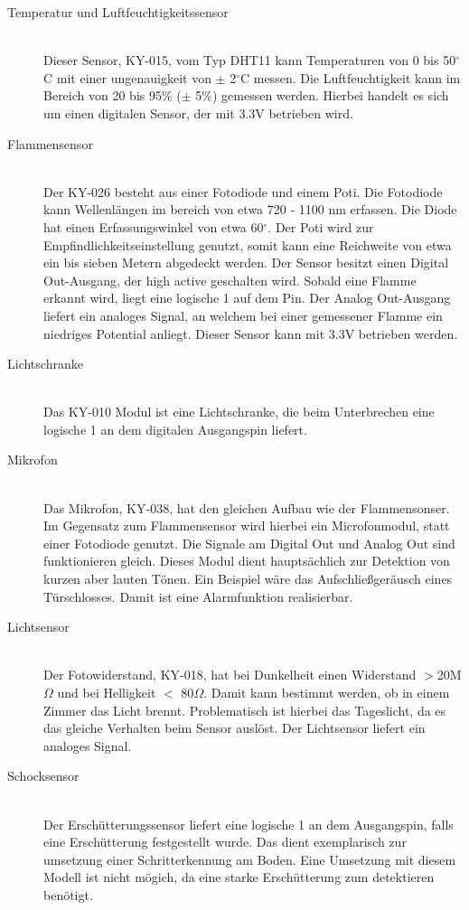 \begin{description}
\item[Temperatur und Luftfeuchtigkeitssensor] \hfill \\
	Dieser Sensor, KY-015, vom Typ DHT11 kann Temperaturen von 0 bis 50$^\circ$C mit einer ungenauigkeit von $\pm$ 2$^\circ$C messen. Die Luftfeuchtigkeit kann im Bereich von 20 bis 95\% ($\pm$ 5\%) gemessen werden. Hierbei handelt es sich um einen digitalen Sensor, der mit 3.3V betrieben wird.  
\item[Flammensensor]\hfill \\
	Der KY-026 besteht aus einer Fotodiode und einem \ac{Poti}. Die Fotodiode kann Wellenlängen im bereich von etwa 720 - 1100 nm erfassen. Die Diode hat einen Erfassungswinkel von etwa 60$^\circ$. Der \ac{Poti} wird zur Empfindlichkeitseinstellung genutzt, somit kann eine Reichweite von etwa  ein bis sieben Metern abgedeckt werden. Der Sensor besitzt einen Digital Out-Ausgang, der high active geschalten wird. Sobald eine Flamme erkannt wird, liegt eine logische 1 auf dem Pin. Der Analog Out-Ausgang liefert ein analoges Signal, an welchem bei einer gemessener Flamme ein niedriges Potential anliegt. Dieser Sensor kann mit 3.3V betrieben werden.
\item[Lichtschranke]\hfill \\
	Das KY-010 Modul ist eine Lichtschranke, die beim Unterbrechen eine logische 1 an dem digitalen Ausgangspin liefert.
\item[Mikrofon]\hfill \\
	Das Mikrofon, KY-038, hat den gleichen Aufbau wie der Flammensonser. Im Gegensatz zum Flammensensor wird hierbei ein Microfonmodul, statt einer Fotodiode genutzt. Die Signale am Digital Out und Analog Out sind funktionieren gleich. Dieses Modul dient hauptsächlich zur Detektion von kurzen aber lauten Tönen. Ein Beispiel wäre das Aufschließgeräusch eines Türschlosses. Damit ist eine Alarmfunktion realisierbar.
\item[Lichtsensor]\hfill \\
	Der Fotowiderstand, KY-018, hat bei Dunkelheit einen Widerstand $>$20M$\Omega$ und bei Helligkeit $<$ 80$\Omega$. Damit kann bestimmt werden, ob in einem Zimmer das Licht brennt. Problematisch ist hierbei das Tageslicht, da es das gleiche Verhalten beim Sensor auslöst. Der Lichtsensor liefert ein analoges Signal.
\item[Schocksensor]\hfill \\
	Der Erschütterungssensor liefert eine logische 1 an dem Ausgangspin, falls eine Erschütterung festgestellt wurde. Das dient exemplarisch zur umsetzung einer Schritterkennung am Boden. Eine Umsetzung mit diesem Modell ist nicht mögich, da eine starke Erschütterung zum detektieren benötigt.
\end{description}